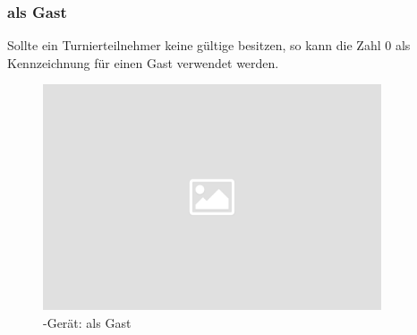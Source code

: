 \subsubsection{\dbvns als Gast}\label{cli/dbv_guest}

\noindent
Sollte ein Turnierteilnehmer keine gültige \dbvn besitzen, so kann die Zahl $0$ als Kennzeichnung für einen Gast verwendet werden.\\[.1cm]

\noindent
\begin{figure}[ht]
	\centering
  \includegraphics[width=10cm]{pictures/placeholder.png}
	\caption{\cli-Gerät: \dbvn als Gast}
	\label{pic/cli_1_dbv_2}
\end{figure}
